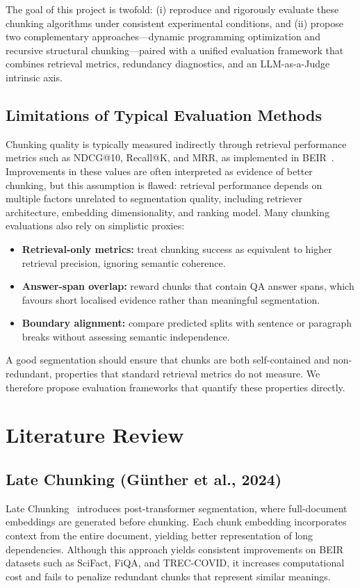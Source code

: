 \documentclass[conference]{IEEEtran}
\begin{document}
The goal of this project is twofold: (i) reproduce and rigorously evaluate
these chunking algorithms under consistent experimental conditions, and
(ii) propose two complementary approaches---dynamic programming
optimization and recursive structural chunking---paired with a unified
evaluation framework that combines retrieval metrics, redundancy
diagnostics, and an LLM-as-a-Judge intrinsic axis.

\subsection{Limitations of Typical Evaluation Methods}

Chunking quality is typically measured indirectly through retrieval
performance metrics such as NDCG@10, Recall@K, and MRR, as implemented in
BEIR~\cite{thakur2021beir}. Improvements in these values are often
interpreted as evidence of better chunking, but this assumption is flawed:
retrieval performance depends on multiple factors unrelated to segmentation
quality, including retriever architecture, embedding dimensionality, and
ranking model. Many chunking evaluations also rely on simplistic proxies:
\begin{itemize}
    \item \textbf{Retrieval-only metrics:} treat chunking success as
    equivalent to higher retrieval precision, ignoring semantic coherence.
    \item \textbf{Answer-span overlap:} reward chunks that contain QA
    answer spans, which favours short localised evidence rather than
    meaningful segmentation.
    \item \textbf{Boundary alignment:} compare predicted splits with
    sentence or paragraph breaks without assessing semantic independence.
\end{itemize}
A good segmentation should ensure that chunks are both self-contained and
non-redundant, properties that standard retrieval metrics do not measure.
We therefore propose evaluation frameworks that quantify these properties
directly.

\section{Literature Review}

\subsection{Late Chunking (G\"unther et al., 2024)}
Late Chunking~\cite{gunther2024late} introduces post-transformer
segmentation, where full-document embeddings are generated before chunking.
Each chunk embedding incorporates context from the entire document,
yielding better representation of long dependencies. Although this approach
yields consistent improvements on BEIR datasets such as SciFact, FiQA, and
TREC-COVID, it increases computational cost and fails to penalize redundant
chunks that represent similar meanings.
\end{document}
